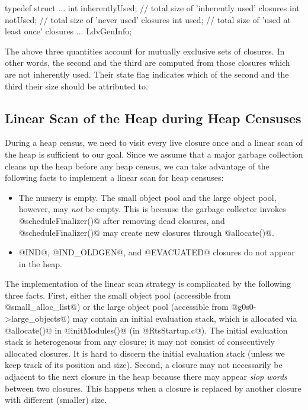 \documentclass{article}
\begin{document}
\begin{code}
typedef struct {
  ...
  int inherentlyUsed;   // total size of 'inherently used' closures
  int notUsed;          // total size of 'never used' closures
  int used;             // total size of 'used at least once' closures
  ...
} LdvGenInfo;
\end{code} 

The above three quantities account for mutually exclusive sets of closures.
In other words, the second and the third are computed from those closures
which are not inherently used. Their state flag indicates which of the
second and the third their size should be attributed to.

\subsection{Linear Scan of the Heap during Heap Censuses}

During a heap census, we need to visit every live closure once and a linear
scan of the heap is sufficient to our goal. 
Since we assume that a major garbage collection cleans up the heap before
any heap census, we can take advantage of the following facts to implement
a linear scan for heap censuses:

\begin{itemize}
\item The nursery is empty. The small object pool and the large object pool, 
      however, may \emph{not} be empty. This is because the garbage collector
      invokes @scheduleFinalizer()@ after removing dead closures, and
      @scheduleFinalizer()@ may create new closures through @allocate()@.
\item @IND@, @IND_OLDGEN@, and @EVACUATED@ closures do not appear in the heap.
\end{itemize}

The implementation of the linear scan strategy is complicated by the
following three facts. 
First, either the small object pool (accessible from @small_alloc_list@) 
or the large object pool (accessible from @g0s0->large_objects@) 
may contain an initial evaluation stack, which is allocated via @allocate()@ in 
@initModules()@ (in @RtsStartup.c@).
The initial evaluation stack is heterogenous from any closure; it may not
consist of consecutively allocated closures.
It is hard to discern the initial evaluation stack (unless
we keep track of its position and size). 
Second, a closure may not necessarily be adjacent to the next closure in the heap
because there may appear \emph{slop words} between two closures.
This happens when a closure is replaced by another closure with different 
(smaller) size.
\end{document}
